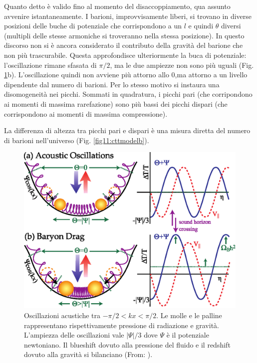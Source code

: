 \vspace{1em}
Quanto detto è valido fino al momento del disaccoppiamento, qua assunto avvenire istantaneamente. I barioni, improvvisamente liberi, si trovano in diverse posizioni delle buche di potenziale che corrispondono a un $l$ e quindi $\theta$ diversi (multipli delle stesse armoniche si troveranno nella stessa posizione). In questo discorso non si è ancora considerato il contributo della gravità del barione che non più trascurabile. Questa approfondisce ulteriormente la buca di potenziale: l'oscillazione rimane sfasata di $\pi/2$, ma le due ampiezze non sono più uguali (Fig. \ref{fig11:osc}b). L'oscillazione quindi non avviene più attorno allo $0$,ma attorno a un livello dipendente dal numero di barioni. Per  lo stesso motivo si instaura una disomogeneità nei picchi. Sommati in quadratura, i picchi pari (che corripondono ai momenti di massima rarefazione) sono più bassi dei picchi dispari (che corrispondono ai momenti di massima compressione). 
\begin{definition}
    La differenza di altezza tra picchi pari e dispari è una misura diretta del numero di barioni nell'universo (Fig. \ref{fig11:cttmodelb}).
\end{definition}

\begin{figure}[H]
    \centering
    \includegraphics[width=.75 \textwidth]{Pictures/11/OscDrag.eps}
    \caption{Oscillazioni acustiche tra $-\pi/2 <kx <\pi/2$. Le molle e le palline rappresentano rispettivamente pressione di radiazione e gravità. L'ampiezza delle oscillazioni vale $|\Psi|/3$ dove $\Psi$ è il potenziale newtoniano. Il blueshift dovuto alla pressione del fluido e il redshift dovuto alla gravità si bilanciano (From: \cite{Hu_1997}).}\label{fig11:osc}
\end{figure}

